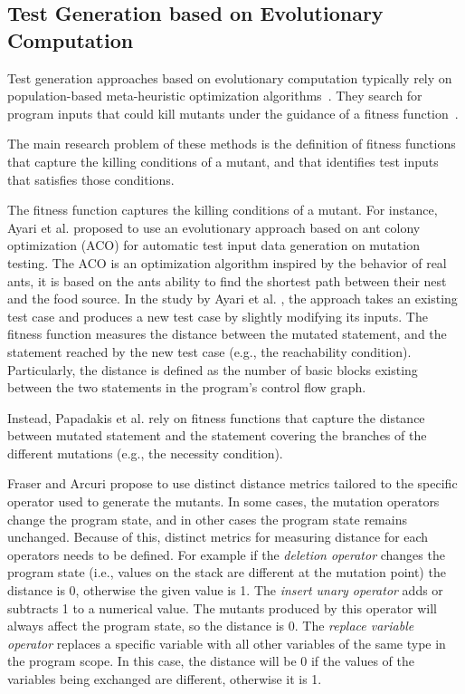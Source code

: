 \subsection{Test Generation based on Evolutionary Computation}

Test generation approaches based on evolutionary computation typically rely on population-based meta-heuristic optimization algorithms~\cite{harman2011strong}. 
They search for program inputs that could kill mutants under the guidance of a fitness function~\cite{harman2011strong}. 

The main research problem of these methods is the definition of fitness functions that capture the killing conditions of a mutant, and that identifies test inputs that satisfies those conditions.

The fitness function captures the killing conditions of a mutant. For instance, Ayari et al. \cite{ayari2007automatic} proposed to use an evolutionary approach based on ant colony optimization (ACO) for automatic test input data generation on mutation testing. The ACO is an optimization algorithm inspired by the behavior of real ants, it is based on the ants ability to find the shortest path between their nest and the food source. In the study by Ayari et al. \cite{ayari2007automatic}, the approach takes an existing test case and produces a new test case by slightly modifying its inputs. 
The fitness function measures the distance between the mutated statement, and the statement reached by the new test case (e.g., the reachability condition). Particularly, the distance is defined as the number of basic blocks existing between the two statements in the program's control flow graph.

Instead, Papadakis et al. \cite{papadakis2011automatically} rely on fitness functions that capture the distance between mutated statement and the statement covering the branches of the different mutations (e.g., the necessity condition).

Fraser and Arcuri \cite{fraser2015achieving} propose to use distinct distance metrics tailored to the specific operator used to generate the mutants.
In some cases, the mutation operators change the program state, and in other cases the program state remains unchanged. Because of this, distinct metrics for measuring distance for each operators needs to be defined.
For example if the \textit{deletion operator} changes the program state (i.e., values on the stack are different at the mutation point) the distance is 0, otherwise the given value is 1. 
The \textit{insert unary operator} adds or subtracts 1 to a numerical value. The mutants produced by this operator will always affect the program state, so the distance is 0.
The \textit{replace variable operator} replaces a specific variable with all other variables of the same type in the program scope. In this case, the distance will be 0 if the values of the variables being exchanged are different, otherwise it is 1.

